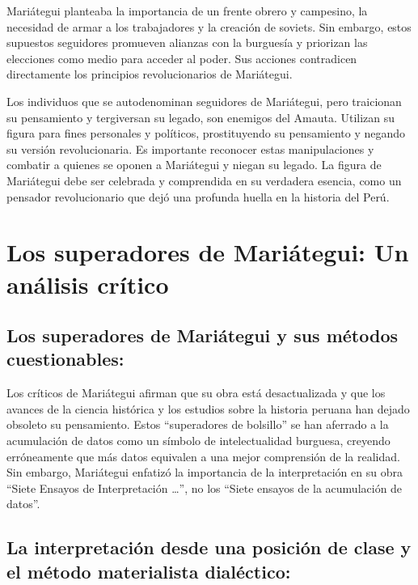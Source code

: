 \documentclass[
  letterpaper,
  DIV=11,
  numbers=noendperiod]{scrartcl}
\begin{document}
Mariátegui planteaba la importancia de un frente obrero y campesino, la
necesidad de armar a los trabajadores y la creación de soviets. Sin
embargo, estos supuestos seguidores promueven alianzas con la burguesía
y priorizan las elecciones como medio para acceder al poder. Sus
acciones contradicen directamente los principios revolucionarios de
Mariátegui.

Los individuos que se autodenominan seguidores de Mariátegui, pero
traicionan su pensamiento y tergiversan su legado, son enemigos del
Amauta. Utilizan su figura para fines personales y políticos,
prostituyendo su pensamiento y negando su versión revolucionaria. Es
importante reconocer estas manipulaciones y combatir a quienes se oponen
a Mariátegui y niegan su legado. La figura de Mariátegui debe ser
celebrada y comprendida en su verdadera esencia, como un pensador
revolucionario que dejó una profunda huella en la historia del Perú.

\hypertarget{los-superadores-de-mariuxe1tegui-un-anuxe1lisis-cruxedtico}{%
\section{Los superadores de Mariátegui: Un análisis
crítico}\label{los-superadores-de-mariuxe1tegui-un-anuxe1lisis-cruxedtico}}

\hypertarget{los-superadores-de-mariuxe1tegui-y-sus-muxe9todos-cuestionables}{%
\subsection{Los superadores de Mariátegui y sus métodos
cuestionables:}\label{los-superadores-de-mariuxe1tegui-y-sus-muxe9todos-cuestionables}}

Los críticos de Mariátegui afirman que su obra está desactualizada y que
los avances de la ciencia histórica y los estudios sobre la historia
peruana han dejado obsoleto su pensamiento. Estos ``superadores de
bolsillo'' se han aferrado a la acumulación de datos como un símbolo de
intelectualidad burguesa, creyendo erróneamente que más datos equivalen
a una mejor comprensión de la realidad. Sin embargo, Mariátegui enfatizó
la importancia de la interpretación en su obra ``Siete Ensayos de
Interpretación \ldots{}'', no los ``Siete ensayos de la acumulación de
datos''.

\hypertarget{la-interpretaciuxf3n-desde-una-posiciuxf3n-de-clase-y-el-muxe9todo-materialista-dialuxe9ctico}{%
\subsection{La interpretación desde una posición de clase y el método
materialista
dialéctico:}\label{la-interpretaciuxf3n-desde-una-posiciuxf3n-de-clase-y-el-muxe9todo-materialista-dialuxe9ctico}}
\end{document}
